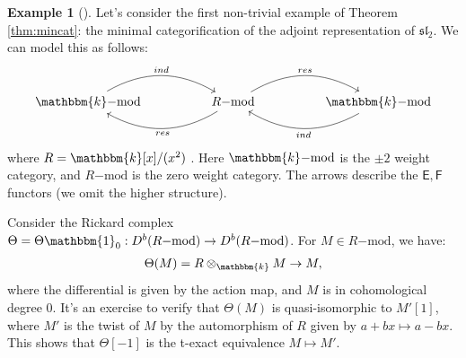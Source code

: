 \documentclass[11pt,reqno]{amsart}
\numberwithin{equation}{section}
\theoremstyle{definition}
\newtheorem{eg}[equation]{Example}
\newenvironment{example}[1][]{\begin{eg}[#1] \pushQED{\qed}}{\popQED \end{eg}}
\theoremstyle{named}
\newcommand{\sE}{\mathsf{E}}
\newcommand{\sF}{\mathsf{F}}
\newcommand{\kk}{\mathbbm{k}}
\newcommand{\fsl}{\mathfrak{sl}}
\newcommand{\bone}{\mathbbm{1}}
\newcommand{\mmod}{\mathrm{-mod}}
\begin{document}
\begin{example}
Let's consider the first non-trivial example of Theorem \ref{thm:mincat}: the minimal categorification of the adjoint representation of $\fsl_2$.  We can model this as follows:
$$
\begin{tikzcd}
\kk\mmod \arrow[rr, bend left, "ind"] &  & R\mmod \arrow[rr, bend left,"res"] \arrow[ll, bend left, "res"] &  & \kk\mmod \arrow[ll, bend left, "ind"]
\end{tikzcd}
$$
where $R=\kk[x]/(x^2)$ \cite[Example 5.17]{CR}.  Here $\kk\mmod$ is the $\pm2$ weight category, and $R\mmod$ is the zero weight category.  The arrows describe the $\sE,\sF$ functors (we omit the higher structure). 

Consider the Rickard complex $\Theta=\Theta\bone_0:D^b(R\mmod) \to D^b(R\mmod)$.  For $M\in R\mmod$, we have:
\begin{align*}
\Theta(M)=R\otimes_\kk M \to M,
\end{align*}
where the differential is given by the action map, and $M$ is in  cohomological degree $0$.  It's an exercise to verify that $\Theta(M)$ is quasi-isomorphic to $M'[1]$, where $M'$ is the twist of $M$ by the automorphism of $R$ given by $a+bx \mapsto a-bx$.  This shows that $\Theta[-1]$ is the t-exact equivalence $M\mapsto M'$.
\end{example}
\end{document}
